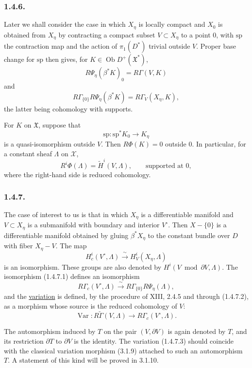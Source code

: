 \subsubsection*{1.4.6.}
Later we shall consider the case in which $X_\eta$ is locally compact
and $X_0$ is obtained from $X_\eta$ by contracting a compact subset
$V\subset X_\eta$ to a point $0$, with $\mathrm{sp}$ the contraction
map and the action of $\pi_1(D^*)$ trivial outside $V$.  Proper base
change for $\mathrm{sp}$ then gives, for
$K\in\operatorname{Ob}D^+(\mathfrak X^*)$,
\begin{equation}\tag{1.4.6.1}
R\Psi_\eta(\beta^*K)_0=R\Gamma(V,K)
\end{equation}
and
\begin{equation}\tag{1.4.6.2}
R\Gamma_{\{0\}}R\Psi_\eta(\beta^*K)
=R\Gamma_V(X_\eta,K),
\end{equation}
the latter being cohomology with supports.

For $K$ on $\mathfrak X$, suppose that
\[
\mathrm{sp}:\mathrm{sp}^*K_0\longrightarrow K_\eta
\]
is a quasi-isomorphism outside $V$.  Then $R\Phi(K)=0$ outside $0$.
In particular, for a constant sheaf $\Lambda$ on $\mathcal X$,
\[
R^i\Phi(\Lambda)=\widetilde H^i(V,\Lambda),
\qquad\text{supported at }0,
\]
where the right-hand side is reduced cohomology.

\subsubsection*{1.4.7.}
The case of interest to us is that in which $X_\eta$ is a
differentiable manifold and $V\subset X_\eta$ is a submanifold with
boundary and interior $V^\circ$.  Then $X-\{0\}$ is a differentiable
manifold obtained by gluing $\beta^*X_\eta$ to the constant bundle
over $D$ with fiber $X_\eta-V$.  The map
\begin{equation}\tag{1.4.7.1}
H_c^i(V^\circ,\Lambda)
\xrightarrow{\ \sim\ }H_V^i(X_\eta,\Lambda)
\end{equation}
is an isomorphism.  These groups are also denoted by
$H^i(V\bmod\partial V,\Lambda)$.  The isomorphism (1.4.7.1) defines
an isomorphism
\begin{equation}\tag{1.4.7.2}
R\Gamma_c(V^\circ,\Lambda)
\xrightarrow{\ \sim\ }
R\Gamma_{\{0\}}R\Psi_\eta(\Lambda),
\end{equation}
and the \underline{variation} is defined, by the procedure of XIII,
2.4.5 and through (1.4.7.2), as a morphism whose source is the reduced
cohomology of $V$:
\begin{equation}\tag{1.4.7.3}
\operatorname{Var}:
R\widetilde\Gamma(V,\Lambda)
\longrightarrow R\Gamma_c(V^\circ,\Lambda).
\end{equation}

The automorphism induced by $T$ on the pair $(V,\partial V)$ is again
denoted by $T$, and its restriction $\partial T$ to $\partial V$ is
the identity.  The variation (1.4.7.3) should coincide with the
classical variation morphism (3.1.9) attached to such an automorphism
$T$.  A statement of this kind will be proved in 3.1.10.

